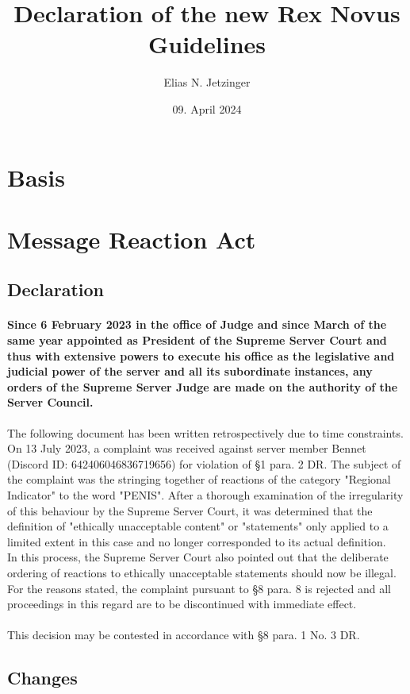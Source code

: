 \documentclass{cjs9}
\title{Declaration of the new Rex Novus Guidelines}
\author{Elias N. Jetzinger}
\date{09. April 2024}
\begin{document}
\maketitle
\newpage
\tableofcontents
\newpage
\section{Basis}
\newpage
\section{Message Reaction Act}
\subsection{Declaration}
\paragraph{Since 6 February 2023 in the office of Judge and since March of the same year appointed as President of the Supreme Server Court and thus with extensive powers to execute his office as the legislative and judicial power of the server and all its subordinate instances, any orders of the Supreme Server Judge are made on the authority of the Server Council.\\}
The following document has been written retrospectively due to time constraints. On 13 July 2023, a complaint was received against server member Bennet (Discord ID: 642406046836719656) for violation of §1 para. 2 DR. The subject of the complaint was the stringing together of reactions of the category "Regional Indicator" to the word "PENIS". After a thorough examination of the irregularity of this behaviour by the Supreme Server Court, it was determined that the definition of "ethically unacceptable content" or "statements" only applied to a limited extent in this case and no longer corresponded to its actual definition.
\\In this process, the Supreme Server Court also pointed out that the deliberate ordering of reactions to ethically unacceptable statements should now be illegal.
\\For the reasons stated, the complaint pursuant to §8 para. 8 is rejected and all proceedings in this regard are to be discontinued with immediate effect.
\\\\This decision may be contested in accordance with §8 para. 1 No. 3 DR.
\subsection{Changes}
\end{document}
